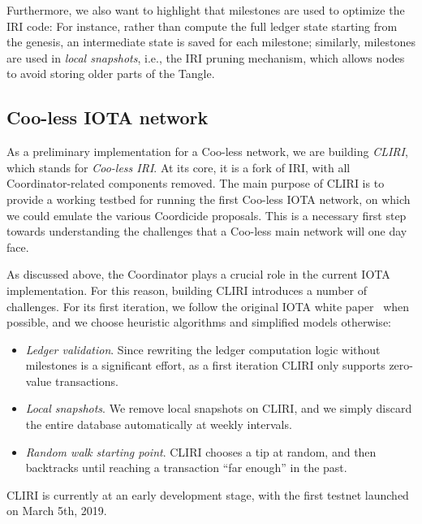 \documentclass[../main.tex]{subfiles}
\begin{document}
	Furthermore, we also want to highlight that milestones are used to optimize the IRI code: For instance, rather than compute the full ledger state starting from the genesis, an intermediate state is saved for each milestone; similarly, milestones are used in \textit{local snapshots}, i.e., the IRI pruning mechanism, which allows nodes to avoid storing older parts of the Tangle.

\subsection{Coo-less IOTA network}
	
	As a preliminary implementation for a Coo-less network, we are building \textit{CLIRI}, which stands for \textit{Coo-less IRI}.
	At its core, it is a fork of IRI, with all Coordinator-related components removed.
	The main purpose of CLIRI is to provide a working testbed for running the first Coo-less IOTA network, on which we could emulate the various Coordicide proposals. This is a necessary first step towards understanding the challenges that a Coo-less main network will one day face.
	
	As discussed above, the Coordinator plays a crucial role in the current IOTA implementation. For this reason, building CLIRI introduces a number of challenges. For its first iteration, we follow the original IOTA white paper~\cite{popov2018} when possible, and we choose heuristic algorithms and simplified models otherwise:
	
	\begin{itemize}
		\item \textit{Ledger validation}. Since rewriting the ledger computation logic without milestones is a significant effort, as a first iteration CLIRI only supports zero-value transactions. 
		
		\item \textit{Local snapshots}. We remove local snapshots on CLIRI, and we simply discard the entire database automatically at weekly intervals.
		
		\item \textit{Random walk starting point}. CLIRI chooses a tip at random, and then backtracks until reaching a transaction ``far enough'' in the past.
		
	\end{itemize}

	CLIRI is currently at an early development stage, with the first testnet launched on March 5th, 2019.
	
\end{document}
